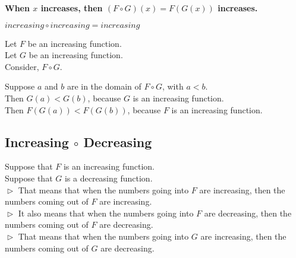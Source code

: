 \documentclass{ximera}
\begin{document}
\begin{center}
\textbf{\textcolor{red!70!black}{When $x$ increases, then $(F \circ G)(x) = F(G(x))$ increases.}}
\end{center}






\begin{fact}
$increasing \circ increasing = increasing$


Let $F$ be an increasing function. \\
Let $G$ be an increasing function. \\


Consider, $F \circ G$.

Suppose $a$ and $b$ are in the domain of $F \circ G$, with $a < b$. \\

Then $G(a) < G(b)$, because $G$ is an increasing function. \\

Then $F(G(a)) < F(G(b))$, because $F$ is an increasing function.


\end{fact}





















\subsection*{Increasing $\circ$ Decreasing}


Suppose that $F$ is an increasing function. \\
Suppose that $G$ is a decreasing function. \\


$\vartriangleright$ That means that when the numbers going into $F$ are increasing, then the numbers coming out of $F$ are increasing. \\

$\vartriangleright$ It also means that when the numbers going into $F$ are decreasing, then the numbers coming out of $F$ are decreasing. \\



$\vartriangleright$ That means that when the numbers going into $G$ are increasing, then the numbers coming out of $G$ are decreasing. \\
\end{document}
